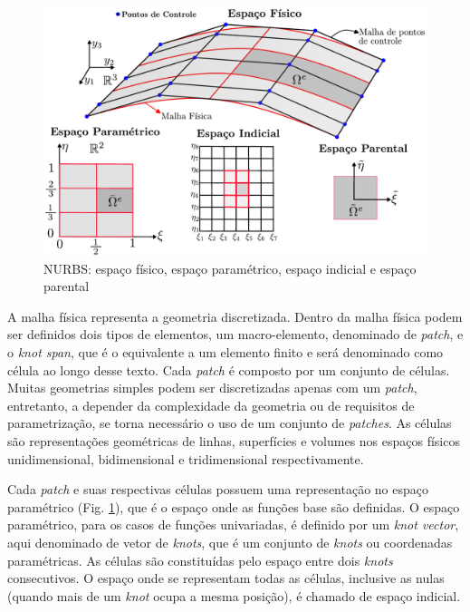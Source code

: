\documentclass[tese_patricia]{subfiles}
\begin{document}
\begin{figure}[htb!]
	\centering 
	\includegraphics[scale=0.7,trim=0cm 0cm 0cm 0cm, clip=true]{Imagens/Cap3/espacos_NURBS.pdf}	
	\caption{NURBS: espaço físico, espaço paramétrico, espaço indicial e espaço parental}
	\label{fig:espacos_NURBS}
\end{figure}

\aquiiii
A malha física representa a geometria discretizada. Dentro da malha física podem ser definidos dois tipos de elementos, um macro-elemento, denominado de \textit{patch}, e o \textit{knot span}, que é o equivalente a um elemento finito e será denominado como célula ao longo desse texto. Cada \textit{patch} é composto por um conjunto de células. Muitas geometrias simples podem ser discretizadas apenas com um \textit{patch}, entretanto, a depender da complexidade da geometria ou de requisitos de parametrização, se torna necessário o uso de um conjunto de \textit{patches}. As células são representações geométricas de linhas, superfícies e volumes nos espaços físicos unidimensional, bidimensional e tridimensional respectivamente.

Cada \textit{patch} e suas respectivas células possuem uma representação no espaço paramétrico (Fig. \ref{fig:espacos_NURBS}), que é o espaço onde as funções base são definidas. O espaço paramétrico, para os casos de funções univariadas, é definido por um \textit{knot vector}, aqui denominado de vetor de \textit{knots}, que é um conjunto de \textit{knots} ou coordenadas paramétricas. As células são constituídas pelo espaço entre dois \textit{knots} consecutivos. O espaço onde se representam todas as células, inclusive as nulas (quando mais de um \textit{knot} ocupa a mesma posição), é chamado de espaço indicial.
\end{document}
